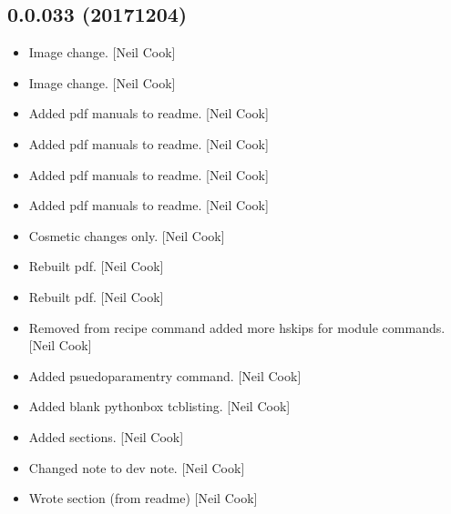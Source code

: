 \documentclass[a4paper,10pt,english]{report}
\begin{document}
\subsection{0.0.033 (2017\sphinxhyphen{}12\sphinxhyphen{}04)}
\label{\detokenize{misc/changelog:id538}}\begin{itemize}
\item {} 
Image change. {[}Neil Cook{]}

\item {} 
Image change. {[}Neil Cook{]}

\item {} 
Added pdf manuals to readme. {[}Neil Cook{]}

\item {} 
Added pdf manuals to readme. {[}Neil Cook{]}

\item {} 
Added pdf manuals to readme. {[}Neil Cook{]}

\item {} 
Added pdf manuals to readme. {[}Neil Cook{]}

\item {} 
Cosmetic changes only. {[}Neil Cook{]}

\item {} 
Rebuilt pdf. {[}Neil Cook{]}

\item {} 
Rebuilt pdf. {[}Neil Cook{]}

\item {} 
Removed  from recipe command added more hskips for module commands.
{[}Neil Cook{]}

\item {} 
Added psuedoparamentry command. {[}Neil Cook{]}

\item {} 
Added blank pythonbox tcblisting. {[}Neil Cook{]}

\item {} 
Added sections. {[}Neil Cook{]}

\item {} 
Changed note to dev note. {[}Neil Cook{]}

\item {} 
Wrote section (from readme) {[}Neil Cook{]}

\end{itemize}
\end{document}
